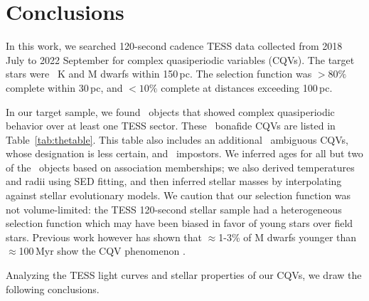 \documentclass[11pt,twocolumn,tighten]{aastex63}
\begin{document}
\section{Conclusions}
\label{sec:conclusion}

In this work, we searched 120-second cadence TESS data collected from
2018 July to 2022 September for complex quasiperiodic variables
(CQVs).  The target stars were \nstarssearched\ K and M dwarfs within
150\,pc.  The selection function was $>$$80\%$ complete within 30\,pc,
and $<$$10\%$ complete at distances exceeding 100\,pc.

In our target sample, we found \ngoods\ objects that showed complex
quasiperiodic behavior over at least one TESS sector.  These \ngoods\
bonafide CQVs are listed in Table~\ref{tab:thetable}.  This table also
includes an additional \nmaybes\ ambiguous CQVs, whose designation is
less certain, and \ndebunked\ impostors.  We inferred ages for all but
two of the \nallcands\ objects based on association memberships; we
also derived temperatures and radii using SED fitting, and then
inferred stellar masses by interpolating against stellar evolutionary
models.  We caution that our selection function was not
volume-limited: the TESS 120-second stellar sample had a heterogeneous
selection function which may have been biased in favor of young stars
over field stars.  Previous work however has shown that $\approx$1-3\%
of M dwarfs younger than $\approx$100\,Myr show the CQV phenomenon
\citep{2016AJ....152..114R,2022AJ....163..144G}.

Analyzing the TESS light curves and stellar properties of our CQVs, we
draw the following conclusions.
\end{document}
